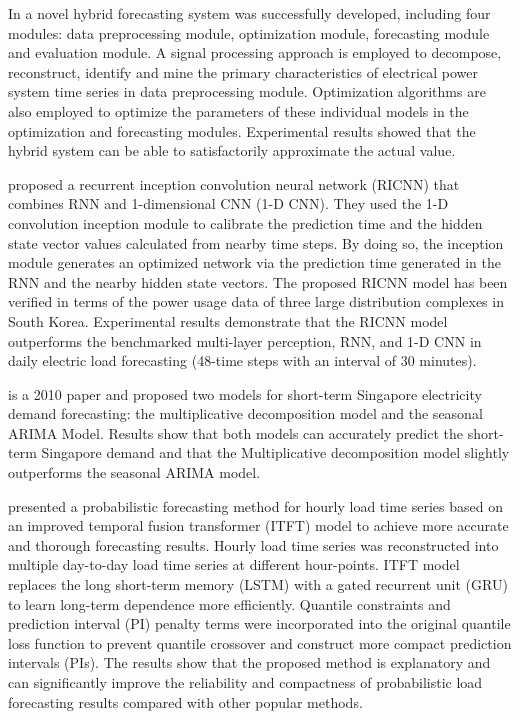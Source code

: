 In \cite{DU2018533} a novel hybrid forecasting system was successfully developed, including four modules: data preprocessing module, optimization module, forecasting module and evaluation module.
A signal processing approach is employed to decompose, reconstruct, identify and mine the primary characteristics of electrical power system time series in data preprocessing module.
Optimization algorithms are also employed to optimize the parameters of these individual models in the optimization and forecasting modules.
Experimental results showed that the hybrid system can be able to satisfactorily approximate the actual value.

\cite{KIM2019328} proposed a recurrent inception convolution neural network (RICNN) that combines RNN and 1-dimensional CNN (1-D CNN).
They used the 1-D convolution inception module to calibrate the prediction time and the hidden state vector values calculated from nearby time steps.
By doing so, the inception module generates an optimized network via the prediction time generated in the RNN and the nearby hidden state vectors.
The proposed RICNN model has been verified in terms of the power usage data of three large distribution complexes in South Korea.
Experimental results demonstrate that the RICNN model outperforms the benchmarked multi-layer perception, RNN, and 1-D CNN in daily electric load forecasting (48-time steps with an interval of 30 minutes).

\cite{5518553} is a 2010 paper and proposed two models for short-term Singapore electricity demand forecasting: the multiplicative decomposition model and the seasonal ARIMA Model.
Results show that both models can accurately predict the short-term Singapore demand and that the Multiplicative decomposition model slightly outperforms the seasonal ARIMA model.

\cite{LI2023108743} presented a probabilistic forecasting method for hourly load time series based on an improved temporal fusion transformer (ITFT) model to achieve more accurate and thorough forecasting results.
Hourly load time series was reconstructed into multiple day-to-day load time series at different hour-points.
ITFT model replaces the long short-term memory (LSTM) with a gated recurrent unit (GRU) to learn long-term dependence more efficiently.
Quantile constraints and prediction interval (PI) penalty terms were incorporated into the original quantile loss function to prevent quantile crossover and construct more compact prediction intervals (PIs).
The results show that the proposed method is explanatory and can significantly improve the reliability and compactness of probabilistic load forecasting results compared with other popular methods.

